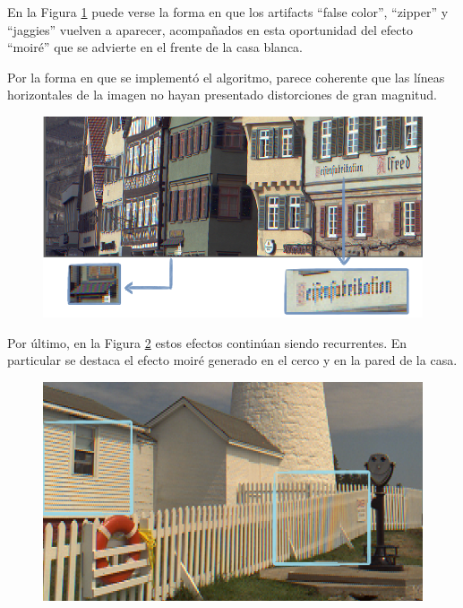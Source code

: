 \documentclass[a4paper]{article}
\begin{document}
En la Figura \ref{alemaniavecino} puede verse la forma en que los artifacts ``false color'',  ``zipper'' y ``jaggies'' vuelven a aparecer, acompañados en esta oportunidad del efecto ``moiré'' que se advierte en el frente de la casa blanca.

Por la forma en que se implementó el algoritmo, parece coherente que las líneas horizontales de la imagen no hayan presentado distorciones de gran magnitud.

\begin{figure}[h!]
	\caption{}
	\begin{center}
	\includegraphics[scale=0.06]{imagenes/alemaniavecino}
	\label{alemaniavecino}
  \end{center}
\end{figure}

\newpage

Por último, en la Figura \ref{casafarovecino} estos efectos continúan siendo recurrentes. En particular se destaca el efecto moiré generado en el cerco y en la pared de la casa.

\begin{figure}[h!]
	\caption{}
	\begin{center}
	\includegraphics[scale=1]{imagenes/casafarovecino}
	\label{casafarovecino}
  \end{center}
\end{figure}
\end{document}
